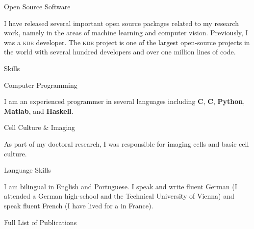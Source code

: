 \documentclass{article}
\renewcommand\section[1]{%
    \par\vspace{2em}%
    {\subhead #1}%
    \par\vspace{1em}%
}
\newcommand\cvitem[2][\relax]{%
    \par\vspace{.8em}
    \if\relax#1\else{\Textsc #1}\hspace{1em}\fi%
    {\Textblack #2}%
    \par\vspace{.4em}
}
\begin{document}
\cvitem{Open Source Software}
I have released several important open source packages related to my research
work, namely in the areas of machine learning and computer vision. Previously,
I was a \textsc{kde} developer. The \textsc{kde} project is one of the largest
open-source projects in the world with several hundred developers and over one
million lines of code.

\section{Skills}

\cvitem{Computer Programming}
I am an experienced programmer in several languages including \textbf{C},
\textbf{C\raisebox{.1em}{\tiny \bf ++}}, \textbf{Python}, \textbf{Matlab}, and
\textbf{Haskell}.

\cvitem{Cell Culture \& Imaging}
As part of my doctoral research, I was responsible for imaging cells and basic
cell culture.

\cvitem{Language Skills}
I am bilingual in English and Portuguese. I speak and write fluent German (I
attended a German high-school and the Technical University of Vienna) and speak
fluent French (I have lived for a in France).

\vspace{4.1em}
\section{Full List of Publications}
\vspace{2em}
\end{document}
